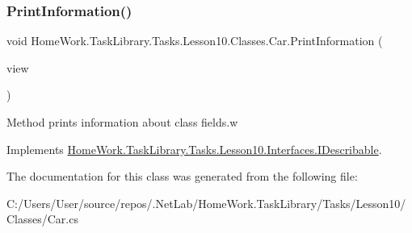 \subsubsection{\texorpdfstring{PrintInformation()}{PrintInformation()}}
{\footnotesize\ttfamily void Home\+Work.\+Task\+Library.\+Tasks.\+Lesson10.\+Classes.\+Car.\+Print\+Information (\begin{DoxyParamCaption}\item[{I\+Information}]{view }\end{DoxyParamCaption})}



Method prints information about class fields.\+w 



Implements \mbox{\hyperlink{interface_home_work_1_1_task_library_1_1_tasks_1_1_lesson10_1_1_interfaces_1_1_i_describable_a38fb49a7a569c7ea7381bfe957960d82}{Home\+Work.\+Task\+Library.\+Tasks.\+Lesson10.\+Interfaces.\+I\+Describable}}.



The documentation for this class was generated from the following file\+:\begin{DoxyCompactItemize}
\item 
C\+:/\+Users/\+User/source/repos/.\+Net\+Lab/\+Home\+Work.\+Task\+Library/\+Tasks/\+Lesson10/\+Classes/Car.\+cs\end{DoxyCompactItemize}
